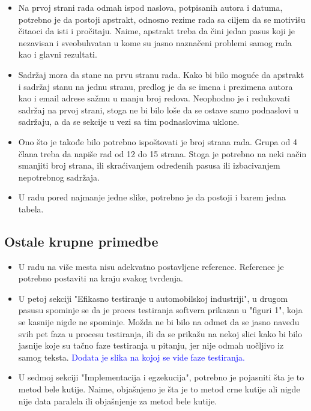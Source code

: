 \documentclass[a4paper]{report}
\newcommand{\odgovor}[1]{\textcolor{blue}{#1}}
\begin{document}
\begin{itemize}

  \item Na prvoj strani rada odmah ispod naslova, potpisanih autora i datuma, potrebno je da postoji apstrakt, odnosno rezime rada sa ciljem da se motivišu čitaoci da isti i pročitaju. Naime, apstrakt treba da čini jedan pasus koji je nezavisan i sveobuhvatan u kome su jasno naznačeni problemi samog rada kao i glavni rezultati. 
  \item Sadržaj mora da stane na prvu stranu rada. Kako bi bilo moguće da apstrakt i sadržaj stanu na jednu stranu, predlog je da se imena i prezimena autora kao i email adrese sažmu u manju broj redova. Neophodno je i redukovati sadržaj na prvoj strani, stoga ne bi bilo loše da se ostave samo podnaslovi u sadržaju, a da se sekcije u vezi sa tim podnaslovima uklone.
  \item Ono što je takođe bilo potrebno ispoštovati je broj strana rada. Grupa od 4 člana treba da napiše rad od 12 do 15 strana. Stoga je potrebno na neki način smanjiti broj strana, ili skraćivanjem određenih pasusa ili izbacivanjem nepotrebnog sadržaja.
  \item U radu pored najmanje jedne slike, potrebno je da postoji i barem jedna tabela.

\end{itemize}

\subsection{Ostale krupne primedbe}

\begin{itemize}

\item U radu na više mesta nisu adekvatno postavljene reference. Reference je potrebno postaviti na kraju svakog tvrđenja.
 
\item U petoj sekciji "Efikasno testiranje u automobilskoj industriji", u drugom pasusu spominje se da je proces testiranja softvera prikazan u "figuri 1", koja se kasnije nigde ne spominje. Možda ne bi bilo na odmet da se jasno navedu svih pet faza u procesu testiranja, ili da se prikažu na nekoj slici kako bi bilo jasnije koje su tačno faze testiranja u pitanju, jer nije odmah uočljivo iz samog teksta. \odgovor{Dodata je slika na kojoj se vide faze testiranja.}

\item U sedmoj sekciji "Implementacija i egzekucija", 
potrebno je pojasniti šta je to metod bele kutije. Naime, objašnjeno je šta je to metod crne kutije ali nigde nije data paralela ili objašnjenje za metod bele kutije.

\end{itemize}
\end{document}

